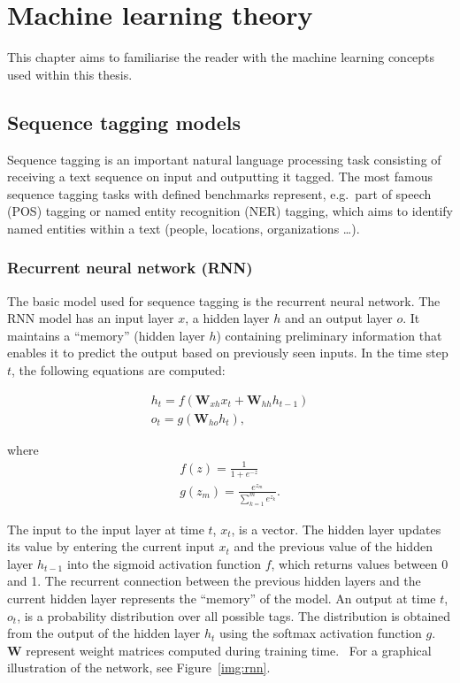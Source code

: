 \chapter{Machine learning theory}\label{chap:ml-theory}
\begin{chapterabstract}
This chapter aims to familiarise the reader with the machine learning concepts used within this thesis.
\end{chapterabstract}

\section{Sequence tagging models}
Sequence tagging is an important natural language processing task consisting of receiving a text sequence on input and outputting it tagged. The most famous sequence tagging tasks with defined benchmarks represent, e.g.~part of speech (POS) tagging or named entity recognition (NER) tagging, which aims to identify named entities within a text (people, locations, organizations \ldots).~\cite{BiLSTMCRF}

\subsection{Recurrent neural network (RNN)}
The basic model used for sequence tagging is the recurrent neural network. The RNN model has an input layer $x$, a hidden layer $h$ and an output layer $o$. It maintains a \enquote{memory} (hidden layer $h$) containing preliminary information that enables it to predict the output based on previously seen inputs. In the time step $t$, the following equations are computed:

\begin{gather}
    h_t = f(\mathbf{W}_{xh}x_t + \mathbf{W}_{hh}h_{t-1})\\
    o_t = g(\mathbf{W}_{ho}h_t),
\end{gather}

where
\begin{gather}
    f(z) = \frac{1}{1 + e^{-z}}\\
    g(z_m) = \frac{e^{z_m}}{\sum_{k=1}^{m} e^{z_k}}.
\end{gather}

The input to the input layer at time $t$, $x_t$, is a vector. The hidden layer updates its value by entering the current input $x_t$ and the previous value of the hidden layer $h_{t-1}$ into the sigmoid activation function $f$, which returns values between 0 and 1. The recurrent connection between the previous hidden layers and the current hidden layer represents the \enquote{memory} of the model. An output at time $t$, $o_t$, is a probability distribution over all possible tags. The distribution is obtained from the output of the hidden layer $h_t$ using the softmax activation function $g$. $\mathbf{W}$ represent weight matrices computed during training time.~\cite{BiLSTMCRF} For a graphical illustration of the network, see Figure~\ref{img:rnn}.

